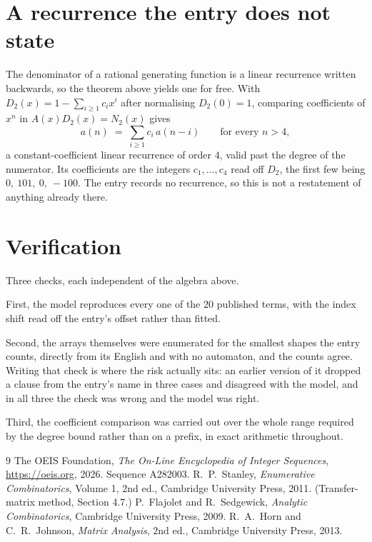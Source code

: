 \documentclass[11pt,a4paper]{article}
\theoremstyle{plain}
\theoremstyle{definition}
\begin{document}
\section{A recurrence the entry does not state}

The denominator of a rational generating function is a linear recurrence written backwards, so
the theorem above yields one for free. With $D_2(x)=1-\sum_{i\ge1}c_ix^i$ after normalising
$D_2(0)=1$, comparing coefficients of $x^n$ in $A(x)D_2(x)=N_2(x)$ gives
\[
a(n)\;=\;\sum_{i\ge1}c_i\,a(n-i)\qquad\text{for every }n>4,
\]
a constant-coefficient linear recurrence of order $4$, valid past the degree of the
numerator. Its coefficients are the integers $c_1,\dots,c_{4}$ read off $D_2$, the first few being $0,\ 101,\ 0,\ -100$. The entry records no recurrence, so this is not a restatement of anything
already there.

\section{Verification}

Three checks, each independent of the algebra above.

First, the model reproduces every one of the $20$ published terms, with the index shift
read off the entry's offset rather than fitted.

Second, the arrays themselves were enumerated for the smallest shapes the entry counts,
directly from its English and with no automaton, and the counts agree. Writing that check is
where the risk actually sits: an earlier version of it dropped a clause from the entry's name
in three cases and disagreed with the model, and in all three the check was wrong and the model
was right.

Third, the coefficient comparison was carried out over the whole range required by the degree
bound rather than on a prefix, in exact arithmetic throughout.

\begin{thebibliography}{9}
 The OEIS Foundation, \emph{The On-Line Encyclopedia of Integer
Sequences}, \url{https://oeis.org}, 2026. Sequence A282003.
 R.~P.~Stanley, \emph{Enumerative Combinatorics}, Volume 1, 2nd ed.,
Cambridge University Press, 2011. (Transfer-matrix method, Section 4.7.)
 P.~Flajolet and R.~Sedgewick, \emph{Analytic Combinatorics}, Cambridge
University Press, 2009.
 R.~A.~Horn and C.~R.~Johnson, \emph{Matrix Analysis}, 2nd ed., Cambridge
University Press, 2013.
\end{thebibliography}
\end{document}
